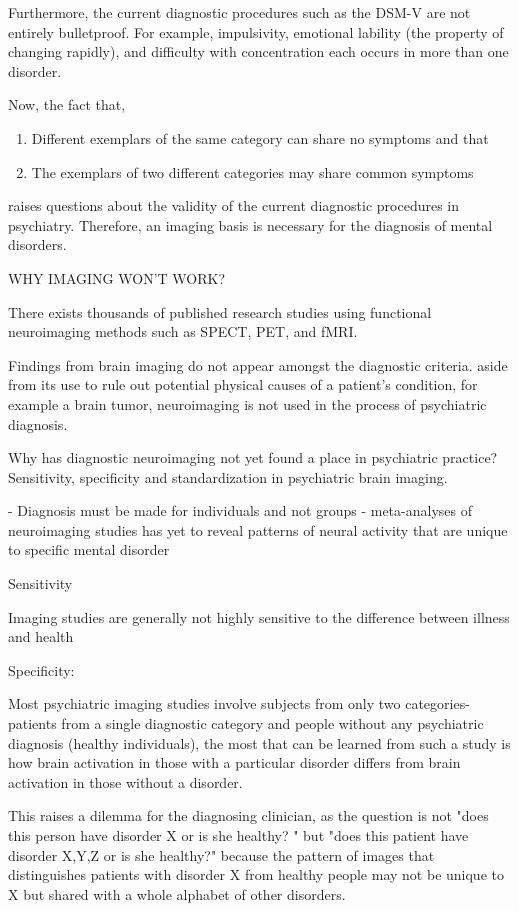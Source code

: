 \documentclass{article}
\begin{document}
Furthermore, the current diagnostic procedures such as the DSM-V are
not entirely bulletproof. For example, impulsivity, emotional lability
(the property of changing rapidly), and difficulty with concentration
each occurs in more than one disorder.

Now, the fact that,

\begin{enumerate}[nosep]
  \item Different exemplars of the same category can share no
    symptoms and that
  \item The exemplars of two different categories may share common
    symptoms
\end{enumerate}

raises questions about the validity of the current diagnostic
procedures in psychiatry. Therefore, an imaging basis is necessary for
the diagnosis of mental disorders.

WHY IMAGING WON'T WORK?

There exists thousands of published research studies using
functional neuroimaging methods such as SPECT, PET, and fMRI.

Findings from brain imaging do not appear amongst the diagnostic
criteria. aside from its use to rule out potential physical causes
of a patient's condition, for example a brain tumor, neuroimaging
is not used in the process of psychiatric diagnosis.

Why has diagnostic neuroimaging not yet found a place in
psychiatric practice? Sensitivity, specificity and standardization
in psychiatric brain imaging.

    - Diagnosis must be made for individuals and not groups
    - meta-analyses of neuroimaging studies has yet to reveal
      patterns of neural activity that are unique to specific
      mental disorder

Sensitivity

Imaging studies are generally not highly sensitive to the
difference between illness and health

Specificity:

Most psychiatric imaging studies involve subjects from only two
categories- patients from a single diagnostic category and people
without any psychiatric diagnosis (healthy individuals), the most
that can be learned from such a study is how brain activation in
those with a particular disorder differs from brain activation in
those without a disorder.

This raises a dilemma for the diagnosing clinician, as the
question is not "does this person have disorder X or is she
healthy? " but "does this patient have disorder X,Y,Z or is she
healthy?" because the pattern of images that distinguishes
patients with disorder X from healthy people may not be unique to
X but shared with a whole alphabet of other disorders.
\end{document}
